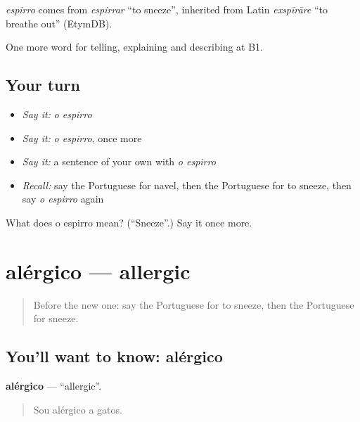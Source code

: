 \begin{cousinweb}
\emph{espirro} comes from \emph{espirrar} \textquotedblleft{}to sneeze\textquotedblright{}, inherited from Latin \emph{exspīrāre} \textquotedblleft{}to breathe out\textquotedblright{} (EtymDB).
\end{cousinweb}

\begin{grammarlens}[title={What you've built}]
One more word for telling, explaining and describing at B1.
\end{grammarlens}

\subsection*{Your turn}
\begin{itemize}
\raggedright
  \item \emph{Say it:} \emph{o espirro}
  \item \emph{Say it:} \emph{o espirro}, once more
  \item \emph{Say it:} a sentence of your own with \emph{o espirro}
  \item \emph{Recall:} say the Portuguese for navel, then the Portuguese for to sneeze, then say \emph{o espirro} again
\end{itemize}

\begin{tcolorbox}[breakable,colback=teal!4,colframe=teal!35!black,title={Before you move on}]
What does o espirro mean? (\textquotedblleft{}Sneeze\textquotedblright{}.) Say it once more.
\end{tcolorbox}
\section[alérgico]{alérgico — allergic}

\label{lesson:PT-C483-alergico}



\begin{quote}
Before the new one: say the Portuguese for to sneeze, then the Portuguese for sneeze.
\end{quote}

\subsection*{You'll want to know: alérgico}
\textbf{alérgico} — \textquotedblleft{}allergic\textquotedblright{}.

\begin{quote}
Sou alérgico a gatos.
\end{quote}

